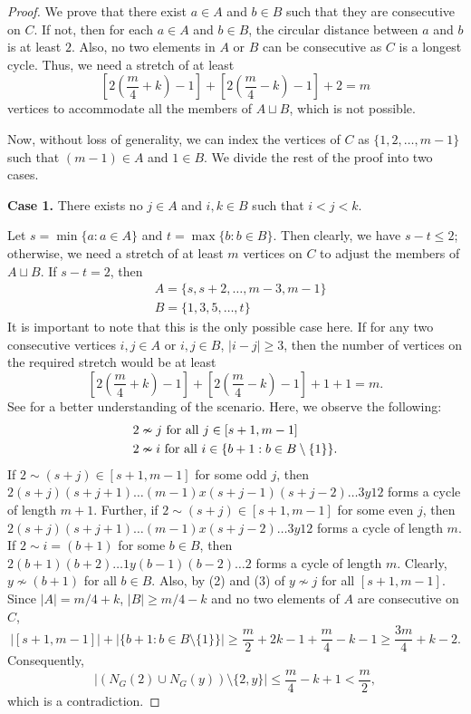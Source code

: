 \documentclass[12pt]{article}
\theoremstyle{definition}
\begin{document}
\begin{proof}
    We prove that there exist $a\in A$ and $b\in B$ such that they are consecutive on $C$. If not, then for each $a\in A$ and $b\in B$, the circular distance between $a$ and $b$ is at least $2$. Also, no two elements in $A$ or $B$ can be consecutive as $C$ is a longest cycle. Thus, we need a stretch of at least
    \begin{equation*}
        \left[2\left(\frac{m}{4}+k\right)-1\right]+\left[2\left(\frac{m}{4}-k\right)-1\right]+2=m
    \end{equation*}
     vertices to accommodate all the members of $A\sqcup B$, which is not possible. 



Now, without loss of generality, we can index the vertices of $C$ as $\{1,2,\ldots,m-1\}$ such that $(m-1)\in A$ and $1\in B$. We divide the rest of the proof into two cases.

\textbf{Case 1.} There exists no $j\in A$ and $i,k\in B$ such that $i<j<k$.

Let $s=\min\{a:a\in A\}$ and $t=\max\{b:b\in B\}$. Then clearly, we have $s-t\leq 2$; otherwise, we need a stretch of at least $m$ vertices on $C$ to adjust the members of $A\sqcup B$. If $s-t=2$, then 
\begin{align*}
    &A=\{s,s+2,\ldots,m-3, m-1\}\\
    &B=\{1,3,5,\ldots,t\}
\end{align*}
It is important to note that this is the only possible case here. If for any two consecutive vertices $i,j\in A$ or $i,j\in B$, $|i-j|\geq 3$, then the number of vertices on the required stretch would be at least
\begin{equation*}
    \left[2\left(\frac{m}{4}+k\right)-1\right]+\left[2\left(\frac{m}{4}-k\right)-1\right]+1+1=m.    
\end{equation*}
See  for a better understanding of the scenario. Here, we observe the following: 
\begin{align*}
    &2\nsim j \textnormal{ for all } j\in [s+1,m-1]\\
    &2\nsim i \textnormal{ for all } i\in \{b+1:b\in B\setminus \{1\}\}.
\end{align*}
If $2\sim (s+j)\in [s+1,m-1]$ for some odd $j$, then $2(s+j)(s+j+1)\ldots (m-1)x(s+j-1)(s+j-2)\ldots 3y12$ forms a cycle of length $m+1$. Further, if $2\sim (s+j)\in [s+1,m-1]$ for some even $j$, then $2(s+j)(s+j+1)\ldots (m-1)x(s+j-2)\ldots 3y12$ forms a cycle of length $m$. If $2\sim i=(b+1)$ for some $b\in B$, then $2(b+1)(b+2)\ldots 1y(b-1)(b-2)\ldots 2$ forms a cycle of length $m$. Clearly, $y\nsim (b+1)$ for all $b\in B$. Also, by (2) and (3) of  $y\nsim j$ for all $[s+1,m-1]$.  Since $|A|=m/4+k$, $|B|\geq m/4-k$ and no two elements of $A$ are consecutive on $C$,
\begin{equation*}
    |[s+1,m-1]|+|\{b+1:b\in B\setminus\{1\}\}|\geq \frac{m}{2}+2k-1+\frac{m}{4}-k-1\geq \frac{3m}{4}+k-2.
\end{equation*}
Consequently,
\begin{equation*}
        |(N_{G}(2)\cup N_{G}(y))\setminus\{2,y\}|\leq \frac{m}{4}-k+1<\frac{m}{2},
\end{equation*}
which is a contradiction.


\end{proof}
\end{document}
